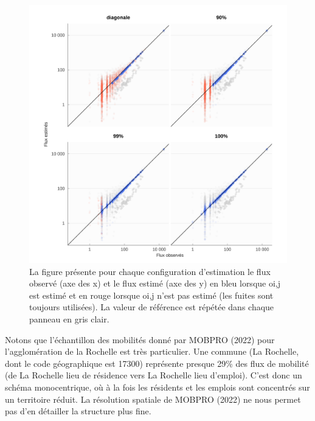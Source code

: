 \documentclass[
  10pt,
  a4paper,
  numbers=noendperiod,
  DIV=9]{scrartcl}
\begin{document}
\begin{figure}[htb]

{\centering \includegraphics[width=1\textwidth,height=\textheight]{larochelle_files/figure-pdf/fig-actvsfit-np-1.png}

}

\caption[\emph{MEAPS} observés versus estimés]{\label{fig-actvsfit-np}La
figure présente pour chaque configuration d'estimation le flux observé
(axe des x) et le flux estimé (axe des y) en bleu lorsque oi,j est
estimé et en rouge lorsque oi,j n'est pas estimé (les fuites sont
toujours utilisées). La valeur de référence est répétée dans chaque
panneau en gris clair.}

\end{figure}

Notons que l'échantillon des mobilités donné par MOBPRO (2022) pour
l'agglomération de la Rochelle est très particulier. Une commune (La
Rochelle, dont le code géographique est 17300) représente presque 29\%
des flux de mobilité (de La Rochelle lieu de résidence vers La Rochelle
lieu d'emploi). C'est donc un schéma monocentrique, où à la fois les
résidents et les emplois sont concentrés sur un territoire réduit. La
résolution spatiale de MOBPRO (2022) ne nous permet pas d'en détailler
la structure plus fine.
\end{document}
